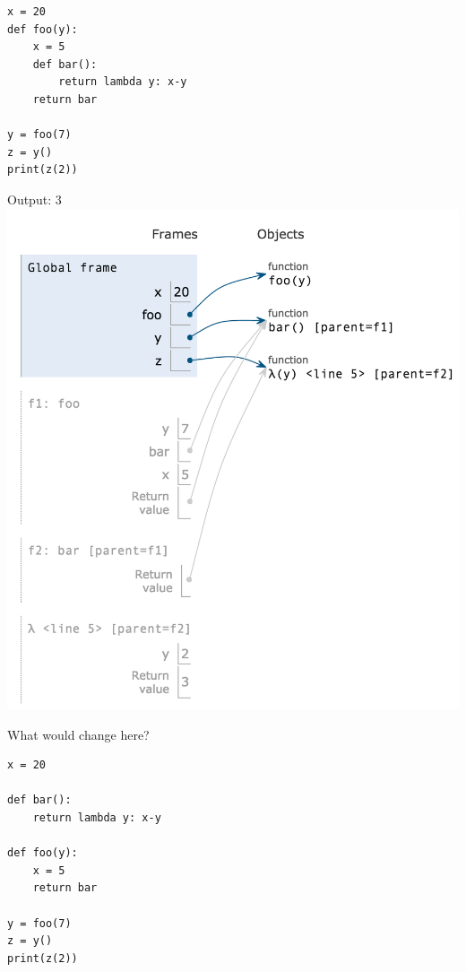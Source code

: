 \documentclass{exam}
\begin{document}
\begin{questions}
\begin{blocksection}
\begin{lstlisting}
x = 20
def foo(y):
    x = 5
    def bar():
        return lambda y: x-y
    return bar

y = foo(7)
z = y()
print(z(2))
\end{lstlisting}

\begin{solution}[2in] \newline
    Output: 3 \newline
    \includegraphics[scale=0.5]{img/foobar.png}
\end{solution}
\end{blocksection}

\begin{blocksection}
\question What would change here?

\begin{lstlisting}
x = 20

def bar():
    return lambda y: x-y

def foo(y):
    x = 5
    return bar

y = foo(7)
z = y()
print(z(2))
\end{lstlisting}


\end{blocksection}
\end{questions}
\end{document}
